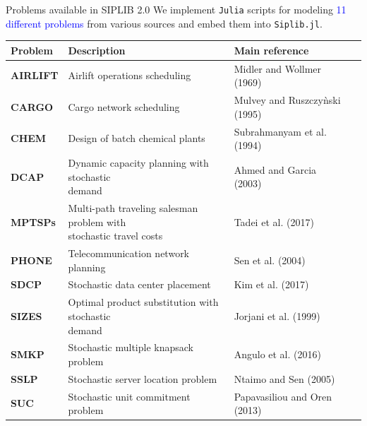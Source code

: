\documentclass[usenames,dvipsnames]{beamer}
\def\ttiny{\fontsize{6pt}{6pt}\selectfont}
\newcommand{\siplibtwo}{\textsf{SIPLIB 2.0}}
\newcommand{\airlift}{\textsf{AIRLIFT}}
\newcommand{\chem}{\textsf{CHEM}}
\newcommand{\dcap}{\textsf{DCAP}}
\newcommand{\sdcp}{\textsf{SDCP}}
\newcommand{\mptsps}{\textsf{MPTSPs}}
\newcommand{\sizes}{\textsf{SIZES}}
\newcommand{\smkp}{\textsf{SMKP}}
\newcommand{\sslp}{\textsf{SSLP}}
\newcommand{\suc}{\textsf{SUC}}
\newcommand{\cargo}{\textsf{CARGO}}
\newcommand{\phone}{\textsf{PHONE}}
\newcommand{\siplibjl}{\texttt{Siplib.jl}}
\begin{document}
\begin{frame}{Problems available in \siplibtwo}
We implement \texttt{Julia} scripts for modeling \textcolor{blue}{11 different problems} from various sources and embed them into \siplibjl.
\ttiny
		\begin{table}[H]
	\centering
	\label{table:problems}
	\begin{tabular}{@{}llll@{}}
		\toprule
		\textbf{Problem}		  		  & Description                                                        & Main reference              \\ \midrule
		\textbf{\airlift} & Airlift operations scheduling & Midler and Wollmer (1969)  \\
		\textbf{\cargo} & Cargo network scheduling  & Mulvey and Ruszczy\`{n}ski (1995) \\
		\textbf{\chem} & Design of batch chemical plants& Subrahmanyam et al. (1994) \\				
		\textbf{\dcap}         & \makecell[tl]{Dynamic capacity planning with stochastic\\ demand  }                  & Ahmed and Garcia (2003)                           \\
		\textbf{\mptsps}       & \makecell[tl]{Multi-path traveling salesman problem with\\ stochastic travel costs } & Tadei et al. (2017)                             \\
		\textbf{\phone}       & Telecommunication network planning & Sen et al. (2004)                            \\
		\textbf{\sdcp} 	& Stochastic data center placement  & Kim et al. (2017) \\
		\textbf{\sizes}        & \makecell[tl]{Optimal product substitution with stochastic\\ demand}         & Jorjani et al. (1999)        \\
		\textbf{\smkp}		  & Stochastic multiple knapsack problem                               & Angulo et al. (2016)                           \\
		\textbf{\sslp}         & Stochastic server location problem                                 & Ntaimo and Sen (2005)                           \\
		\textbf{\suc}         & Stochastic unit commitment problem			               & Papavasiliou and Oren (2013)                        \\ \bottomrule
	\end{tabular}%
\end{table}
\end{frame}
\end{document}
